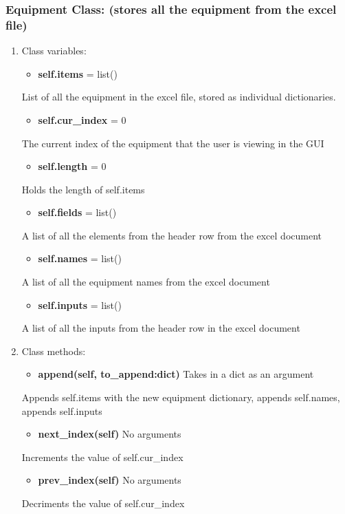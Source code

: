 \documentclass[11pt]{article}
\begin{document}
\subsubsection{Equipment Class: (stores all the equipment from the excel file)}
\label{sec:org22b82d8}
\begin{enumerate}
\item Class variables:
\label{sec:org4cb61c6}
\begin{itemize}
\item \textbf{self.items} = list()
\end{itemize}
List of all the equipment in the excel file, stored as individual dictionaries.

\begin{itemize}
\item \textbf{self.cur\_index} = 0
\end{itemize}
The current index of the equipment that the user is viewing in the GUI

\begin{itemize}
\item \textbf{self.length} = 0
\end{itemize}
Holds the length of self.items

\begin{itemize}
\item \textbf{self.fields} = list()
\end{itemize}
A list of all the elements from the header row from the excel document

\begin{itemize}
\item \textbf{self.names} = list()
\end{itemize}
A list of all the equipment names from the excel document

\begin{itemize}
\item \textbf{self.inputs} = list()
\end{itemize}
A list of all the inputs from the header row in the excel document

\item Class methods:
\label{sec:org19681f6}

\begin{itemize}
\item \textbf{append(self, to\_append:dict)} Takes in a dict as an argument
\end{itemize}
Appends self.items with the new equipment dictionary, appends self.names, appends self.inputs

\begin{itemize}
\item \textbf{next\_index(self)} No arguments
\end{itemize}
Increments the value of self.cur\_index

\begin{itemize}
\item \textbf{prev\_index(self)} No arguments
\end{itemize}
Decriments the value of self.cur\_index
\end{enumerate}
\end{document}
